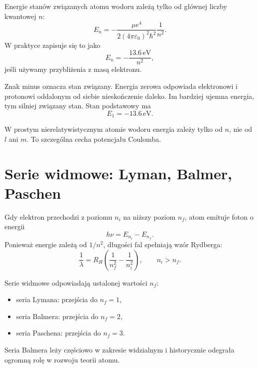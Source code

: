 Energie stanów związanych atomu wodoru zależą tylko od głównej liczby kwantowej \(n\):
\begin{equation}
    E_n=-\frac{\mu e^4}{2(4\pi\varepsilon_0)^2\hbar^2}\frac{1}{n^2}.
\end{equation}
W praktyce zapisuje się to jako
\begin{equation}
    E_n=-\frac{13.6\,\mathrm{eV}}{n^2},
\end{equation}
jeśli używamy przybliżenia z masą elektronu.

Znak minus oznacza stan związany. Energia zerowa odpowiada elektronowi i protonowi oddalonym od siebie nieskończenie daleko. Im bardziej ujemna energia, tym silniej związany stan. Stan podstawowy ma
\begin{equation}
    E_1=-13.6\,\mathrm{eV}.
\end{equation}

\begin{summarybox}
W prostym nierelatywistycznym atomie wodoru energia zależy tylko od \(n\), nie od \(l\) ani \(m\). To szczególna cecha potencjału Coulomba.
\end{summarybox}

\section{Serie widmowe: Lyman, Balmer, Paschen}

Gdy elektron przechodzi z poziomu \(n_i\) na niższy poziom \(n_f\), atom emituje foton o energii
\begin{equation}
    h\nu=E_{n_i}-E_{n_f}.
\end{equation}
Ponieważ energie zależą od \(1/n^2\), długości fal spełniają wzór Rydberga:
\begin{equation}
    \frac{1}{\lambda}=R_H\left(\frac{1}{n_f^2}-\frac{1}{n_i^2}\right),
    \qquad n_i>n_f.
\end{equation}

Serie widmowe odpowiadają ustalonej wartości \(n_f\):
\begin{itemize}
    \item seria Lymana: przejścia do \(n_f=1\),
    \item seria Balmera: przejścia do \(n_f=2\),
    \item seria Paschena: przejścia do \(n_f=3\).
\end{itemize}
Seria Balmera leży częściowo w zakresie widzialnym i historycznie odegrała ogromną rolę w rozwoju teorii atomu.

